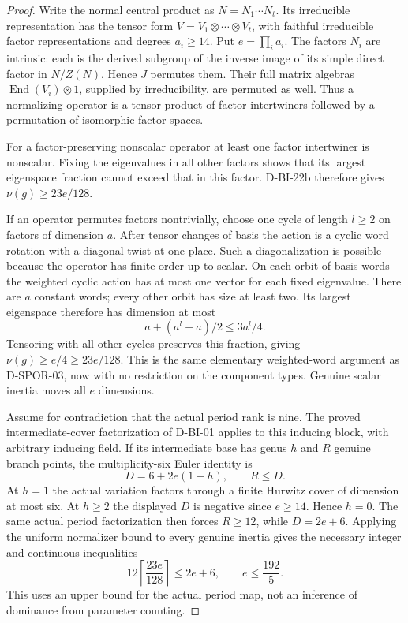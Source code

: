 \begin{proof}
Write the normal central product as $N=N_1\cdots N_t$.
Its irreducible representation has the tensor form
$V=V_1\otimes\cdots\otimes V_t$, with faithful irreducible
factor representations and degrees $a_i\ge14$.
Put $e=\prod_i a_i$.
The factors $N_i$ are intrinsic: each is the derived subgroup
of the inverse image of its simple direct factor in $N/Z(N)$.
Hence $J$ permutes them.  Their full matrix algebras
$\operatorname{End}(V_i)\otimes1$, supplied by irreducibility,
are permuted as well.  Thus a normalizing operator is a tensor
product of factor intertwiners followed by a permutation of
isomorphic factor spaces.

For a factor-preserving nonscalar operator at least one factor
intertwiner is nonscalar.  Fixing the eigenvalues in all other
factors shows that its largest eigenspace fraction cannot exceed
that in this factor.  D-BI-22b therefore gives
$\nu(g)\ge23e/128$.

If an operator permutes factors nontrivially, choose one cycle
of length $l\ge2$ on factors of dimension $a$.
After tensor changes of basis the action is a cyclic word rotation
with a diagonal twist at one place.  Such a diagonalization is
possible because the operator has finite order up to scalar.
On each orbit of basis words the weighted cyclic action has at
most one vector for each fixed eigenvalue.  There are $a$ constant
words; every other orbit has size at least two.  Its largest
eigenspace therefore has dimension at most
\[
                  a+(a^l-a)/2\le3a^l/4.
\]
Tensoring with all other cycles preserves this fraction, giving
$\nu(g)\ge e/4\ge23e/128$.  This is the same elementary
weighted-word argument as D-SPOR-03, now with no restriction on
the component types.  Genuine scalar inertia moves all $e$
dimensions.

Assume for contradiction that the actual period rank is nine.
The proved intermediate-cover factorization of D-BI-01 applies
to this inducing block, with arbitrary inducing field.  If its
intermediate base has genus $h$ and $R$ genuine branch points,
the multiplicity-six Euler identity is
\[
                    D=6+2e(1-h),\qquad R\le D.
\]
At $h=1$ the actual variation factors through a finite Hurwitz
cover of dimension at most six.  At $h\ge2$ the displayed $D$
is negative since $e\ge14$.  Hence $h=0$.  The same actual
period factorization then forces $R\ge12$, while $D=2e+6$.
Applying the uniform normalizer bound to every genuine inertia
gives the necessary integer and continuous inequalities
\[
  12\left\lceil\frac{23e}{128}\right\rceil\le2e+6,
                 \qquad e\le\frac{192}{5}.                \tag{BI.90}
\]
This uses an upper bound for the actual period map, not an
inference of dominance from parameter counting.


\end{proof}
